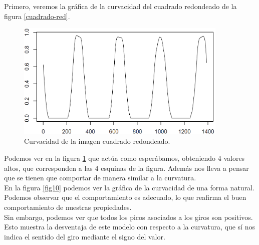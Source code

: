 Primero, veremos la gráfica de la curvacidad del cuadrado redondeado de la figura \ref{cuadrado-red}.

\begin{figure}[H]
\begin{center}
\includegraphics[width=0.9\textwidth]{img/nolin-dev3-1-limpio-0815.png}
\end{center}

\caption{Curvacidad de la imagen cuadrado redondeado.}
\label{fig9}
\end{figure}

Podemos ver en la figura \ref{fig9} que actúa como esperábamos, obteniendo 4 valores altos, que corresponden a las 4 esquinas de la figura. Además nos lleva a pensar que se tienen que comportar de manera similar a la curvatura.\\

En la figura \ref{fig10} podemos ver la gráfica de la curvacidad de una forma natural. Podemos observar que el comportamiento es adecuado, lo que reafirma el buen comportamiento de nuestras propiedades.\\

Sin embargo, podemos ver que todos los picos asociados a los giros son positivos. Esto muestra la desventaja de este modelo con respecto a la curvatura, que sí nos indica el sentido del giro mediante el signo del valor.\\

